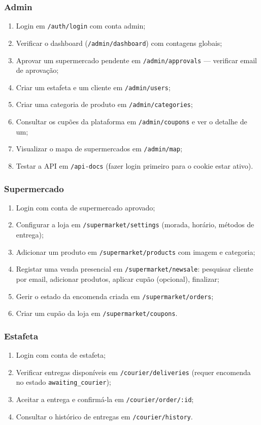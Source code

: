 \documentclass[12pt,a4paper]{article}
\begin{document}
\subsubsection{Admin}
\begin{enumerate}[leftmargin=*, label=\arabic*.]
  \item Login em \texttt{/auth/login} com conta admin;
  \item Verificar o dashboard (\texttt{/admin/dashboard}) com contagens globais;
  \item Aprovar um supermercado pendente em \texttt{/admin/approvals} --- verificar email de aprovação;
  \item Criar um estafeta e um cliente em \texttt{/admin/users};
  \item Criar uma categoria de produto em \texttt{/admin/categories};
  \item Consultar os cupões da plataforma em \texttt{/admin/coupons} e ver o detalhe de um;
  \item Visualizar o mapa de supermercados em \texttt{/admin/map};
  \item Testar a API em \texttt{/api-docs} (fazer login primeiro para o cookie estar ativo).
\end{enumerate}

\subsubsection{Supermercado}
\begin{enumerate}[leftmargin=*, label=\arabic*.]
  \item Login com conta de supermercado aprovado;
  \item Configurar a loja em \texttt{/supermarket/settings} (morada, horário, métodos de entrega);
  \item Adicionar um produto em \texttt{/supermarket/products} com imagem e categoria;
  \item Registar uma venda presencial em \texttt{/supermarket/newsale}: pesquisar cliente por email, adicionar produtos, aplicar cupão (opcional), finalizar;
  \item Gerir o estado da encomenda criada em \texttt{/supermarket/orders};
  \item Criar um cupão da loja em \texttt{/supermarket/coupons}.
\end{enumerate}

\subsubsection{Estafeta}
\begin{enumerate}[leftmargin=*, label=\arabic*.]
  \item Login com conta de estafeta;
  \item Verificar entregas disponíveis em \texttt{/courier/deliveries} (requer encomenda no estado \texttt{awaiting\_courier});
  \item Aceitar a entrega e confirmá-la em \texttt{/courier/order/:id};
  \item Consultar o histórico de entregas em \texttt{/courier/history}.
\end{enumerate}
\end{document}
